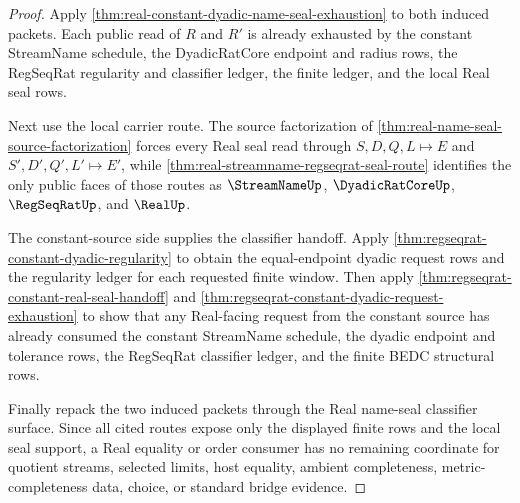 \begin{proof}
Apply \autoref{thm:real-constant-dyadic-name-seal-exhaustion} to both induced packets. Each public read of $R$ and $R'$ is already exhausted by the constant StreamName schedule, the DyadicRatCore endpoint and radius rows, the RegSeqRat regularity and classifier ledger, the finite ledger, and the local Real seal rows.

Next use the local carrier route. The source factorization of \autoref{thm:real-name-seal-source-factorization} forces every Real seal read through $S,D,Q,L \longmapsto E$ and $S',D',Q',L' \longmapsto E'$, while \autoref{thm:real-streamname-regseqrat-seal-route} identifies the only public faces of those routes as $\StreamNameUp$, $\DyadicRatCoreUp$, $\RegSeqRatUp$, and $\RealUp$.

The constant-source side supplies the classifier handoff. Apply \autoref{thm:regseqrat-constant-dyadic-regularity} to obtain the equal-endpoint dyadic request rows and the regularity ledger for each requested finite window. Then apply \autoref{thm:regseqrat-constant-real-seal-handoff} and \autoref{thm:regseqrat-constant-dyadic-request-exhaustion} to show that any Real-facing request from the constant source has already consumed the constant StreamName schedule, the dyadic endpoint and tolerance rows, the RegSeqRat classifier ledger, and the finite BEDC structural rows.

Finally repack the two induced packets through the Real name-seal classifier surface. Since all cited routes expose only the displayed finite rows and the local seal support, a Real equality or order consumer has no remaining coordinate for quotient streams, selected limits, host equality, ambient completeness, metric-completeness data, choice, or standard bridge evidence.
\end{proof}
